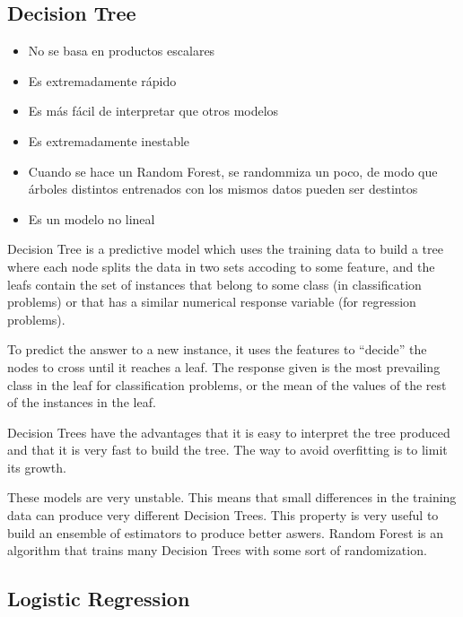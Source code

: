  \subsection{Decision Tree}
  \begin{note}
    \begin{itemize}
      \item No se basa en productos escalares
      \item Es extremadamente rápido
      \item Es más fácil de interpretar que otros modelos
      \item Es extremadamente inestable
      \item Cuando se hace un Random Forest, se randommiza un poco, de modo que
      árboles distintos entrenados con los mismos datos pueden ser destintos
      \item Es un modelo no lineal
    \end{itemize}
  \end{note}
  \begin{pre-delivery}
    Decision Tree is a predictive model which uses the training data to build
    a tree where each node splits the data in two sets accoding to some
    feature, and the leafs contain the set of instances that belong to some class
    (in classification problems) or that has a similar numerical response variable
    (for regression problems).

    To predict the answer to a new instance, it uses the features to ``decide''
    the nodes to cross until it reaches a leaf. The response given is the
    most prevailing class in the leaf for classification problems, or the mean
    of the values of the rest of the instances in the leaf.

    Decision Trees have the advantages that it is easy to interpret the
    tree produced and that it is very fast to build the tree. The way to avoid
    overfitting is to limit its growth.

    These models are very unstable. This means that small differences in the
    training data can produce very different Decision Trees. This property
    is very useful to build an ensemble of estimators to produce better aswers.
    Random Forest is an algorithm that trains many Decision Trees with some sort
    of randomization.
  \end{pre-delivery}
  \subsection{Logistic Regression}
